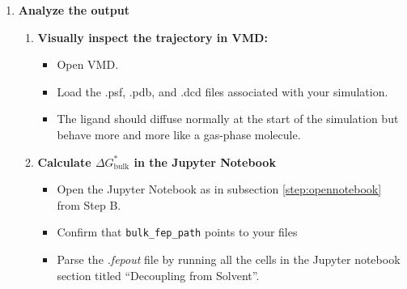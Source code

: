 \documentclass[9pt,tutorial]{Styling/livecoms}
\newcommand{\filepath}[1]{\textit{#1}}
\newcommand{\textInput}[1]{
  \texttt{#1}
}
\begin{document}
\begin{enumerate}
        \item \textbf{Analyze the output} \label{step:analyzeBulk}
        \begin{enumerate}[label=\alph*., ref=\theenumi.\alph*]
            \item \textbf{Visually inspect the trajectory in VMD:}
            \begin{itemize}
                \item Open VMD.
                \item Load the .psf, .pdb, and .dcd files associated with your simulation.
                \item The ligand should diffuse normally at the start of the simulation but behave more and more like a gas-phase molecule.
            \end{itemize}
            \item \textbf{Calculate $\Delta G^*_\mathrm{bulk}$ in the Jupyter Notebook}
            \begin{itemize}
                \item Open the Jupyter Notebook as in subsection \ref{step:opennotebook} from Step B.
                \item Confirm that \textInput{bulk\_fep\_path} points to your files
                \item Parse the \filepath{.fepout} file by running all the cells in the Jupyter notebook section titled ``Decoupling from Solvent''.
            \end{itemize}

        \end{enumerate}

    \end{enumerate}
\end{document}
